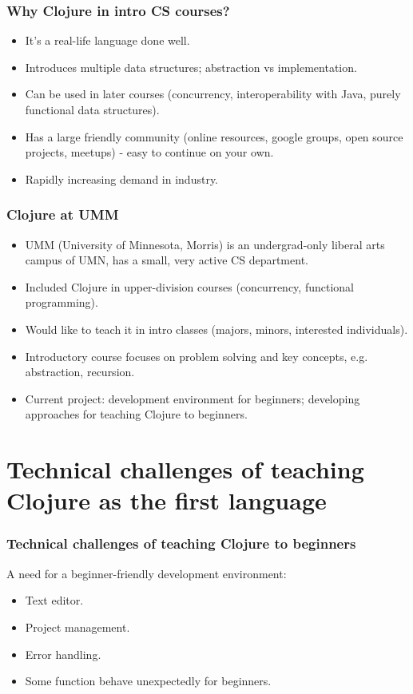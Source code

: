 \documentclass{beamer}
\begin{document}
\begin{frame}
\frametitle{Why Clojure in intro CS courses?}
\begin{itemize}
\item It's a real-life language done well. 
\item Introduces multiple data structures; abstraction vs implementation. 
\item Can be used in later courses  (concurrency, interoperability with Java, purely functional data structures). 
\item Has a large friendly community (online resources, google groups, open source projects, meetups) - easy to continue on your own. 
\item Rapidly increasing demand in industry. 
\end{itemize}
\end{frame}


\begin{frame}
\frametitle{Clojure at UMM}
\begin{itemize}
\item UMM (University of Minnesota, Morris) is an undergrad-only liberal arts campus of UMN, has a small, very active CS department. 
\item Included Clojure in upper-division courses (concurrency, functional programming). 
\item Would like to teach it in intro classes (majors, minors, interested individuals).
\item Introductory course focuses on problem solving and key concepts, e.g. abstraction, recursion.
\item Current project: development environment for beginners; developing approaches for teaching Clojure to beginners. 
\end{itemize}
\end{frame}

\section{Technical challenges of teaching Clojure as the first language}

\begin{frame}
\frametitle{Technical challenges of teaching Clojure to beginners}
A need for a beginner-friendly development environment:
\begin{itemize}
\item Text editor.
\item Project management.
\item Error handling.
\item Some function behave unexpectedly for beginners. 
\end{itemize}
\end{frame}
\end{document}
